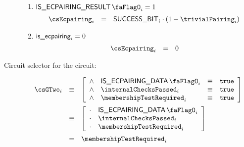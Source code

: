\begin{description}
\begin {enumerate}
\[\begin{array}{lcl}
                        & =      & \acceptablePairOfPoints_{i} \\
                    \end{array}
                \]
            \item \If $\isEcpairingResult_{i} = 1$ \Then
                \[
                    \begin{array}{lcl}
                        \csEcpairing_{i} & = & \ecdataSuccessBit_{i} \cdot (1 - \trivialPairing_{i})
                    \end{array}
                \]
            \item \If $\textsf{is\_ecpairing}_{i} = 0$ \Then
                \[
                    \begin{array}{lcl}
                        \csEcpairing_{i} & = & 0
                    \end{array}
                \]
        \end{enumerate}
    \item[Circuit selector for the \inst{G2\_MEMBERSHIP\_TEST} circuit:]
        \[
            \begin{array}{lcl}
                \csGTwo_{i} & \equiv &
                \left[ \begin{array}{clcr}
                    \wedge & \isEcpairingData_{i}        & \equiv & \texttt{true} \\
                    \wedge & \internalChecksPassed_{i}   & \equiv & \texttt{true} \\
                    \wedge & \membershipTestRequired_{i} & \equiv & \texttt{true} \\
                \end{array} \right] \vspace{2mm} \\
                & \equiv & 
                \left[ \begin{array}{clcr}
                    \cdot & \isEcpairingData_{i}        \\
                    \cdot & \internalChecksPassed_{i}   \\
                    \cdot & \membershipTestRequired_{i} \\
                \end{array} \right] \vspace{2mm} \\
                & =      & \membershipTestRequired_{i} \\
            \end{array}
        \]
\end{description}

